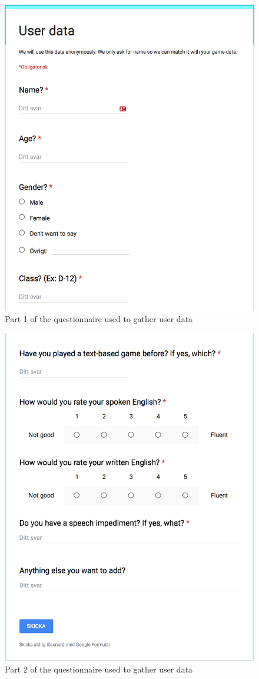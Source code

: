 \documentclass[a4paper,12pt]{kth-mag}
\begin{document}
\begin{figure}[ht]
	\centering
	\includegraphics[keepaspectratio, scale = 0.8]{images/user_data_1.png}
	\caption{\small{Part 1 of the questionnaire used to gather user data}}\label{fig:ud_1}
\end{figure}

\begin{figure}[ht]
	\centering
	\includegraphics[keepaspectratio, scale = 0.8]{images/user_data_2.png}
	\caption{\small{Part 2 of the questionnaire used to gather user data}}\label{fig:ud_2}
\end{figure}
\end{document}
